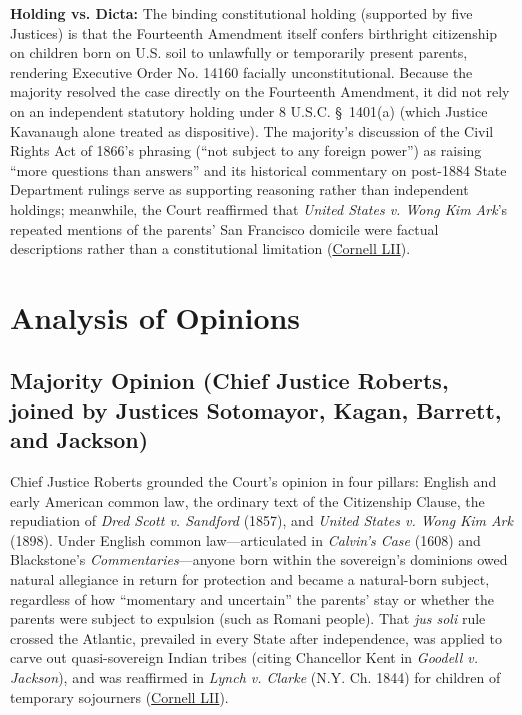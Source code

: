 \documentclass[12pt]{article}
\begin{document}
\textbf{Holding vs. Dicta:} The binding constitutional holding (supported by five Justices) is that the Fourteenth Amendment itself confers birthright citizenship on children born on U.S. soil to unlawfully or temporarily present parents, rendering Executive Order No. 14160 facially unconstitutional. Because the majority resolved the case directly on the Fourteenth Amendment, it did not rely on an independent statutory holding under 8 U.S.C. \S\ 1401(a) (which Justice Kavanaugh alone treated as dispositive). The majority's discussion of the Civil Rights Act of 1866's phrasing (``not subject to any foreign power'') as raising ``more questions than answers'' and its historical commentary on post-1884 State Department rulings serve as supporting reasoning rather than independent holdings; meanwhile, the Court reaffirmed that \textit{United States v. Wong Kim Ark}'s repeated mentions of the parents' San Francisco domicile were factual descriptions rather than a constitutional limitation (\href{https://www.law.cornell.edu/supremecourt/text/25-365}{Cornell LII}).

\section{Analysis of Opinions}

\subsection{Majority Opinion (Chief Justice Roberts, joined by Justices Sotomayor, Kagan, Barrett, and Jackson)}
Chief Justice Roberts grounded the Court's opinion in four pillars: English and early American common law, the ordinary text of the Citizenship Clause, the repudiation of \textit{Dred Scott v. Sandford} (1857), and \textit{United States v. Wong Kim Ark} (1898). Under English common law---articulated in \textit{Calvin's Case} (1608) and Blackstone's \textit{Commentaries}---anyone born within the sovereign's dominions owed natural allegiance in return for protection and became a natural-born subject, regardless of how ``momentary and uncertain'' the parents' stay or whether the parents were subject to expulsion (such as Romani people). That \textit{jus soli} rule crossed the Atlantic, prevailed in every State after independence, was applied to carve out quasi-sovereign Indian tribes (citing Chancellor Kent in \textit{Goodell v. Jackson}), and was reaffirmed in \textit{Lynch v. Clarke} (N.Y. Ch. 1844) for children of temporary sojourners (\href{https://www.law.cornell.edu/supremecourt/text/25-365}{Cornell LII}).
\end{document}

